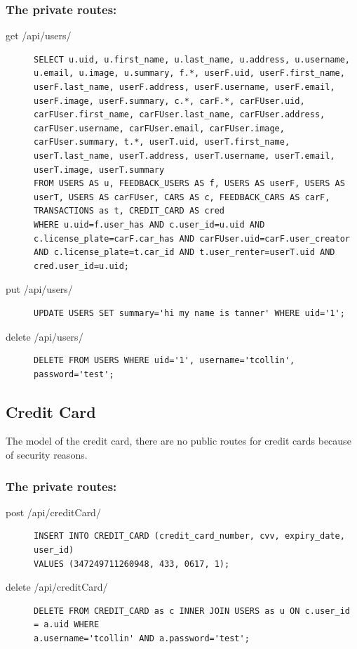 \documentclass{article}
\begin{document}
\subsubsection{The private routes:}
\begin{description}
\item[get /api/users/] \mbox{}
\begin{lstlisting}[style=sql]
SELECT u.uid, u.first_name, u.last_name, u.address, u.username, u.email, u.image, u.summary, f.*, userF.uid, userF.first_name, userF.last_name, userF.address, userF.username, userF.email, userF.image, userF.summary, c.*, carF.*, carFUser.uid, carFUser.first_name, carFUser.last_name, carFUser.address, carFUser.username, carFUser.email, carFUser.image, carFUser.summary, t.*, userT.uid, userT.first_name, userT.last_name, userT.address, userT.username, userT.email, userT.image, userT.summary
FROM USERS AS u, FEEDBACK_USERS AS f, USERS AS userF, USERS AS userT, USERS AS carFUser, CARS AS c, FEEDBACK_CARS AS carF, TRANSACTIONS as t, CREDIT_CARD AS cred
WHERE u.uid=f.user_has AND c.user_id=u.uid AND c.license_plate=carF.car_has AND carFUser.uid=carF.user_creator AND c.license_plate=t.car_id AND t.user_renter=userT.uid AND cred.user_id=u.uid;
\end{lstlisting}

\item[put /api/users/] \mbox{}
\begin{lstlisting}[style=sql]
UPDATE USERS SET summary='hi my name is tanner' WHERE uid='1';
\end{lstlisting}

\item[delete /api/users/] \mbox{}
\begin{lstlisting}[style=sql]
DELETE FROM USERS WHERE uid='1', username='tcollin', password='test';
\end{lstlisting}
\end{description}

\subsection{Credit Card}
The model of the credit card, there are no public routes for credit cards because of security reasons.

\subsubsection{The private routes:}
\begin{description}
\item[post /api/creditCard/] \mbox{}
\begin{lstlisting}[style=sql]
INSERT INTO CREDIT_CARD (credit_card_number, cvv, expiry_date, user_id)
VALUES (347249711260948, 433, 0617, 1);
\end{lstlisting}

\item[delete /api/creditCard/] \mbox{}
\begin{lstlisting}[style=sql]
DELETE FROM CREDIT_CARD as c INNER JOIN USERS as u ON c.user_id = a.uid WHERE
a.username='tcollin' AND a.password='test';
\end{lstlisting}
\end{description}
\end{document}

